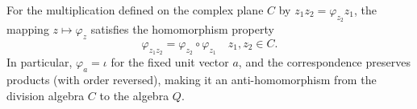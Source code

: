 For the multiplication defined on the complex plane $C$ by $z_1 z_2 = \varphi_{z_2} z_1$, the mapping $z \mapsto \varphi_z$ satisfies the homomorphism property
$$
\varphi_{z_1 z_2} = \varphi_{z_2} \circ \varphi_{z_1} \quad z_1, z_2 \in C.
$$
In particular, $\varphi_a = \iota$ for the fixed unit vector $a$, and the correspondence preserves products (with order reversed), making it an anti-homomorphism from the division algebra $C$ to the algebra $Q$.
